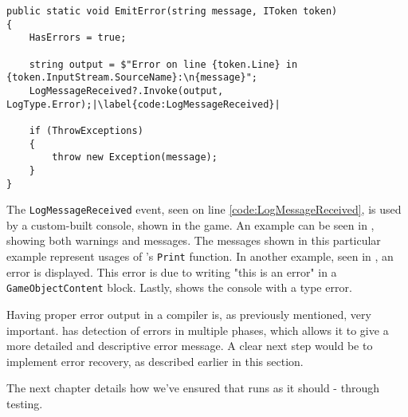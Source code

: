 \begin{lstlisting}[caption={\texttt{EmitError} in the \texttt{DazelLogger}.}, label={lst:EmitErrorCode}, escapechar=|]
public static void EmitError(string message, IToken token)
{
    HasErrors = true;
    
    string output = $"Error on line {token.Line} in {token.InputStream.SourceName}:\n{message}";
    LogMessageReceived?.Invoke(output, LogType.Error);|\label{code:LogMessageReceived}|

    if (ThrowExceptions)
    {
        throw new Exception(message);
    }
}
\end{lstlisting}

The \texttt{LogMessageReceived} event, seen on line \ref{code:LogMessageReceived}, is used by a custom-built console, shown in the \dazel{} game. An example can be seen in , showing both warnings and messages. The messages shown in this particular example represent usages of \dazel{}'s \texttt{Print} function. In another example, seen in , an error is displayed. This error is due to writing "this is an error" in a \texttt{GameObjectContent} block. Lastly,  shows the \dazel{} console with a type error.


Having proper error output in a compiler is, as previously mentioned, very important. \dazel{} has detection of errors in multiple phases, which allows it to give a more detailed and descriptive error message. A clear next step would be to implement error recovery, as described earlier in this section.

The next chapter details how we've ensured that \dazel{} runs as it should - through testing.
